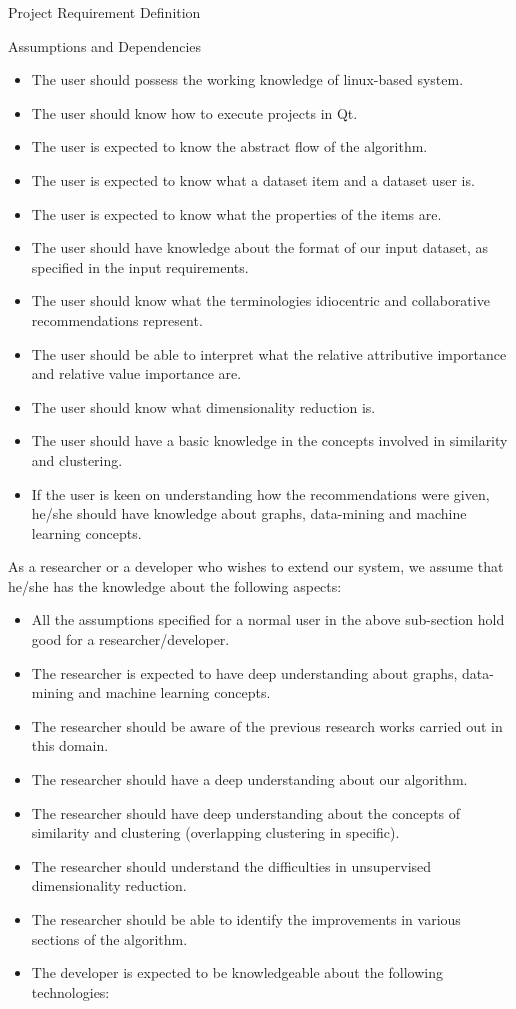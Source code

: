 \documentclass{report}
\begin{document}
\begin{projChapter}{Project Requirement Definition}
\begin{projSection}{Assumptions and Dependencies}
\begin{itemize}
  \item The user should possess the working knowledge of linux-based system.
  \item The user should know how to execute projects in Qt.
  \item The user is expected to know the abstract flow of the algorithm.
  \item The user is expected to know what a dataset item and a dataset user is.
  \item The user is expected to know what the properties of the items are.
  \item The user should have knowledge about the format of our input dataset, as specified in the input requirements.
  \item The user should know what the terminologies idiocentric and collaborative recommendations represent.
  \item The user should be able to interpret what the relative attributive importance and relative value importance are.
  \item The user should know what dimensionality reduction is.
  \item The user should have a basic knowledge in the concepts involved in similarity and clustering.
  \item If the user is keen on understanding how the recommendations were given, he/she should have knowledge about graphs, data-mining and machine learning concepts.
\end{itemize}


As a researcher or a developer who wishes to extend our system, we assume that he/she has the knowledge about the following aspects:

\begin{itemize}
  \item All the assumptions specified for a normal user in the above sub-section hold good for a researcher/developer.
  \item The researcher is expected to have deep understanding about graphs, data-mining and machine learning concepts.
  \item The researcher should be aware of the previous research works carried out in this domain.
  \item The researcher should have a deep understanding about our algorithm.
  \item The researcher should have deep understanding about the concepts of similarity and clustering (overlapping clustering in specific).
  \item The researcher should understand the difficulties in unsupervised dimensionality reduction.
  \item The researcher should be able to identify the improvements in various sections of the algorithm.
  \item The developer is expected to be knowledgeable about the following technologies:


\end{itemize}
\end{projSection}
\end{projChapter}
\end{document}
